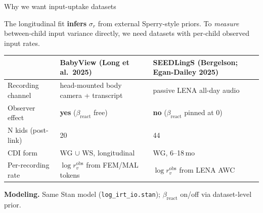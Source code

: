 \documentclass[aspectratio=169,t]{beamer}
\newcommand{\sigr}{\sigma_{r}}
\begin{document}
\begin{frame}{Why we want input-uptake datasets}

The longitudinal fit \textbf{infers} $\sigr$ from external Sperry-style
priors. To \emph{measure} between-child input variance directly, we
need datasets with per-child observed input rates.

\vspace{0.6em}
\begin{tabularx}{\linewidth}{lXX}
\toprule
& \textbf{BabyView} (Long et al.\ 2025) &
\textbf{SEEDLingS} (Bergelson; Egan-Dailey 2025) \\
\midrule
Recording channel & head-mounted body camera + transcript & passive
LENA all-day audio \\
Observer effect   & \textbf{yes} ($\beta_{\mathrm{react}}$ free) &
\textbf{no} ($\beta_{\mathrm{react}}$ pinned at 0) \\
N kids (post-link) & 20 & 44 \\
CDI form          & WG $\cup$ WS, longitudinal & WG, 6--18\,mo \\
Per-recording rate & $\log r^{\mathrm{obs}}_v$ from FEM/MAL tokens &
$\log r^{\mathrm{obs}}_v$ from LENA AWC \\
\bottomrule
\end{tabularx}

\vspace{0.4em}
\textbf{Modeling.} Same Stan model (\texttt{log\_irt\_io.stan});
$\beta_{\mathrm{react}}$ on/off via dataset-level prior.

\end{frame}
\end{document}
